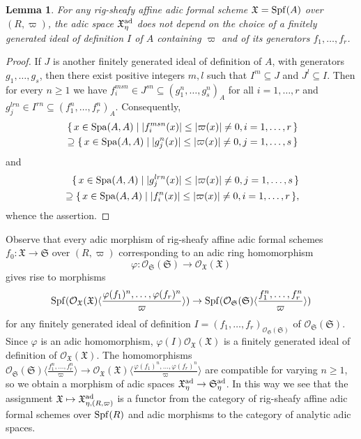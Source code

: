\documentclass[12pt,twoside,a4paper]{article}
\newtheorem{lemma}[thm]{Lemma}
\theoremstyle{definition}
\theoremstyle{remark}
\newcommand\ad{{\rm ad}}
\newcommand\Spa{{\rm Spa}}
\newcommand\Spf{{\rm Spf}}
\begin{document}
\begin{lemma}\label{Ideals of definition and generic fiber}For any rig-sheafy affine adic formal scheme $\mathfrak{X}=\Spf(A)$ over $(R, \varpi)$, the adic space $\mathfrak{X}_{\eta}^{\ad}$ does not depend on the choice of a finitely generated ideal of definition $I$ of $A$ containing $\varpi$ and of its generators $f_1,\dots, f_r$.\end{lemma}
\begin{proof}If $J$ is another finitely generated ideal of definition of $A$, with generators $g_1,\dots, g_s$, then there exist positive integers $m, l$ such that $I^{m}\subseteq J$ and $J^{l}\subseteq I$. Then for every $n\geq1$ we have $f_{i}^{msn}\in J^{sn}\subseteq (g_1^{n},\dots, g_s^{n})_{A}$ for all $i=1,\dots, r$ and $g_{j}^{lrn}\in I^{rn}\subseteq (f_1^{n},\dots, f_r^{n})_{A}$. Consequently, \begin{align*}\{\, x\in \Spa(A, A) \mid \vert f_{i}^{msn}(x)\vert\leq \vert\varpi(x)\vert\neq 0,  i=1,\dots, r\,\} \\ \supseteq \{\, x\in \Spa(A, A) \mid \vert g_{j}^{n}(x)\vert\leq \vert\varpi(x)\vert\neq 0, j=1,\dots, s\,\}\end{align*}and \begin{align*}\{\, x\in \Spa(A, A) \mid \vert g_{j}^{lrn}(x)\vert\leq \vert\varpi(x)\vert\neq 0, j=1,\dots, s\,\} \\ \supseteq \{\, x\in \Spa(A, A) \mid \vert f_{i}^{n}(x)\vert\leq \vert\varpi(x)\vert\neq 0, i=1,\dots, r\,\},\end{align*}whence the assertion.\end{proof} 
Observe that every adic morphism of rig-sheafy affine adic formal schemes $f_{0}: \mathfrak{X}\to \mathfrak{S}$ over $(R, \varpi)$ corresponding to an adic ring homomorphism \begin{equation*}\varphi: \mathcal{O}_{\mathfrak{S}}(\mathfrak{S})\to\mathcal{O}_{\mathfrak{X}}(\mathfrak{X})\end{equation*}gives rise to morphisms\begin{equation*}\Spf(\mathcal{O}_{\mathfrak{X}}(\mathfrak{X})\langle\frac{\varphi(f_1)^{n},\dots,\varphi(f_r)^{n}}{\varpi}\rangle)\to \Spf(\mathcal{O}_{\mathfrak{S}}(\mathfrak{S})\langle\frac{f_1^{n},\dots,f_r^{n}}{\varpi}\rangle)\end{equation*}for any finitely generated ideal of definition $I=(f_1,\dots,f_r)_{\mathcal{O}_{\mathfrak{S}}(\mathfrak{S})}$ of $\mathcal{O}_{\mathfrak{S}}(\mathfrak{S})$. Since $\varphi$ is an adic homomorphism, $\varphi(I)\mathcal{O}_{\mathfrak{X}}(\mathfrak{X})$ is a finitely generated ideal of definition of $\mathcal{O}_{\mathfrak{X}}(\mathfrak{X})$. The homomorphisms $\mathcal{O}_{\mathfrak{S}}(\mathfrak{S})\langle\frac{f_1^{n},\dots,f_r^{n}}{\varpi}\rangle \to \mathcal{O}_{\mathfrak{X}}(\mathfrak{X})\langle\frac{\varphi(f_1)^{n},\dots,\varphi(f_r)^{n}}{\varpi}\rangle$ are compatible for varying $n\geq1$, so we obtain a morphism of adic spaces $\mathfrak{X}_{\eta}^{\ad}\to \mathfrak{S}_{\eta}^{\ad}$. In this way we see that the assignment $\mathfrak{X}\mapsto \mathfrak{X}_{\eta, (R, \varpi)}^{\ad}$ is a functor from the category of rig-sheafy affine adic formal schemes over $\Spf(R)$ and adic morphisms to the category of analytic adic spaces.
\end{document}
